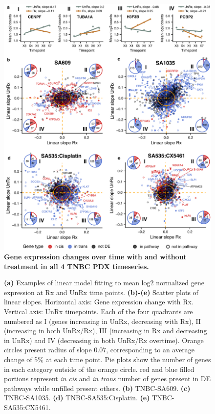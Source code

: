 \begin{figure}
\centering
 \includegraphics[width=\textwidth]{Figures/chap5/fig15_GeneschanginginRxclouds.png}
\caption{\textbf{Gene expression changes over time with and without treatment in all 4 TNBC PDX timeseries.}}%
	\label{fig:GeneschanginginRxclouds}
\end{figure}
\begin{figure}[t]	
\contcaption
	{\small
\textbf{(a)} Examples of linear model fitting to mean log2 normalized gene expression at Rx and UnRx time points. \textbf{(b)-(e)} Scatter plots of linear slopes. Horizontal axis: Gene expression change with Rx. Vertical axis: UnRx timepoints. Each of the four quadrants are numbered as I (genes increasing in UnRx, decreasing with Rx), II (increasing in both UnRx/Rx), III (increasing in Rx and decreasing in UnRx) and  IV (decreasing in both UnRx/Rx overtime). Orange circles present radius of slope 0.07, corresponding to an average change of 5\% at each time point. Pie plots show the number of genes in each category outside of the orange circle. red and blue filled portions represent \textit{in cis} and \textit{in trans} number of genes present in DE pathways while unfilled present others. \textbf{(b)} TNBC-SA609. \textbf{(c)} TNBC-SA1035. %
\textbf{(d)} TNBC-SA535:Cisplatin. \textbf{(e)} TNBC-SA535:CX5461.}


\end{figure}


